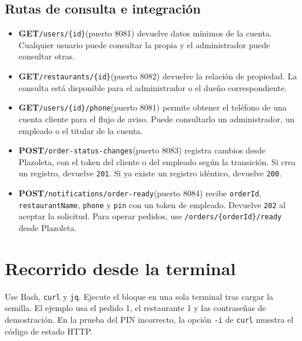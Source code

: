 \documentclass[11pt,a4paper]{article}
\newcommand{\code}[1]{\nolinkurl{#1}}
\newcommand{\route}[2]{\textbf{#1}\enspace\code{#2}}
\newcommand{\call}[3]{\route{#1}{#2}\enspace(puerto #3)}
\begin{document}
\subsection{Rutas de consulta e integración}
\begin{itemize}
\item \call{GET}{/users/{id}}{8081} devuelve datos mínimos de la cuenta. Cualquier usuario puede consultar la propia y el administrador puede consultar otras.
\item \call{GET}{/restaurants/{id}}{8082} devuelve la relación de propiedad. La consulta está disponible para el administrador o el dueño correspondiente.
\item \call{GET}{/users/{id}/phone}{8081} permite obtener el teléfono de una cuenta cliente para el flujo de aviso. Puede consultarlo un administrador, un empleado o el titular de la cuenta.
\item \call{POST}{/order-status-changes}{8083} registra cambios desde Plazoleta, con el token del cliente o del empleado según la transición. Si crea un registro, devuelve \code{201}. Si ya existe un registro idéntico, devuelve \code{200}.
\item \call{POST}{/notifications/order-ready}{8084} recibe \code{orderId}, \code{restaurantName}, \code{phone} y \code{pin} con un token de empleado. Devuelve \code{202} al aceptar la solicitud. Para operar pedidos, use \code{/orders/{orderId}/ready} desde Plazoleta.
\end{itemize}

\clearpage
\section{Recorrido desde la terminal}\label{sec:terminal}
Use Bash, \code{curl} y \code{jq}. Ejecute el bloque en una sola terminal tras cargar la semilla. El ejemplo usa el pedido 1, el restaurante 1 y las contraseñas de demostración. En la prueba del PIN incorrecto, la opción \code{-i} de \code{curl} muestra el código de estado HTTP.
\end{document}
